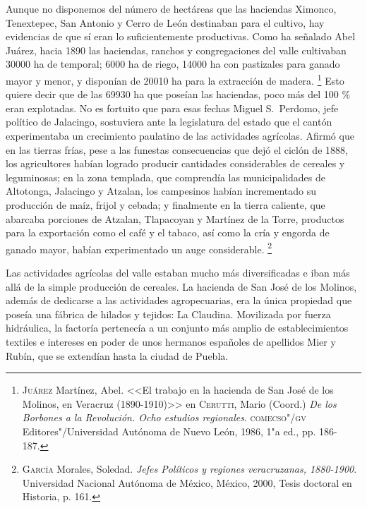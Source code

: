 \documentclass[14pt,twoside,final]{extbook} %
\let\oldfootnote\footnote
\renewcommand\footnote[1]{%
\oldfootnote{\hspace{1mm}#1}}
\begin{document}
Aunque no disponemos del número de hectáreas que las haciendas Ximonco, Tenextepec, San Antonio y Cerro de León destinaban para el cultivo, hay evidencias de que sí eran lo suficientemente productivas. Como ha señalado Abel Juárez, hacia 1890 las haciendas, ranchos y congregaciones del valle cultivaban 30000 ha de temporal; 6000 ha de riego, 14000 ha con pastizales para ganado mayor y menor, y disponían de 20010 ha para la extracción de madera.\footnote{\textsc{Juárez} Martínez, Abel. <<El trabajo en la hacienda de San José de los Molinos, en Veracruz (\mbox{1890-1910})>> en \textsc{Cerutti}, Mario (Coord.) \emph{De los Borbones a la Revolución. Ocho estudios regionales}.
\textsc{comecso"/gv} Editores"/Universidad Autónoma de Nuevo León, 1986, 1"a ed., pp. 186-187.} Esto quiere decir que de las 69930 ha que poseían las haciendas, poco más del 100 \% eran explotadas. No es fortuito que para esas fechas Miguel S.~Perdomo, jefe político de Jalacingo, sostuviera ante la legislatura del estado que el cantón experimentaba un crecimiento paulatino de las actividades agrícolas. Afirmó que en las tierras frías, pese a las funestas consecuencias que dejó el ciclón de 1888, los agricultores habían logrado producir cantidades considerables de cereales y leguminosas; en la zona templada, que comprendía las municipalidades de Altotonga, Jalacingo y Atzalan, los campesinos habían incrementado su producción de maíz, frijol y cebada; y finalmente en la tierra caliente, que abarcaba porciones de Atzalan, Tlapacoyan y Martínez de la Torre, productos para la exportación como el café y el tabaco, así como la cría y engorda de ganado mayor, habían experimentado un auge considerable.\footnote{\textsc{García} Morales, Soledad. \emph{Jefes Políticos y regiones veracruzanas, 1880-1900}. Universidad Nacional Autónoma de México, México, 2000, Tesis doctoral en Historia, p. 161.}

Las actividades agrícolas del valle estaban mucho más diversificadas e iban más allá de la simple producción de cereales. La hacienda de San José de los Molinos, además de dedicarse a las actividades agropecuarias, era la única propiedad que poseía una fábrica de hilados y tejidos: La Claudina. Movilizada por fuerza hidráulica, la factoría pertenecía a un conjunto más amplio de establecimientos textiles e intereses en poder de unos hermanos españoles de apellidos Mier y Rubín, que se extendían hasta la ciudad de Puebla.
\end{document}
